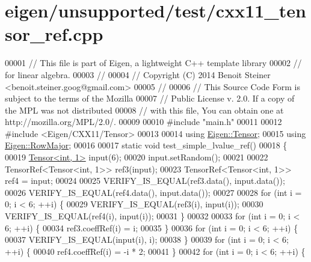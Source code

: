 \hypertarget{eigen_2unsupported_2test_2cxx11__tensor__ref_8cpp_source}{}\section{eigen/unsupported/test/cxx11\+\_\+tensor\+\_\+ref.cpp}
\label{eigen_2unsupported_2test_2cxx11__tensor__ref_8cpp_source}

\begin{DoxyCode}
00001 \textcolor{comment}{// This file is part of Eigen, a lightweight C++ template library}
00002 \textcolor{comment}{// for linear algebra.}
00003 \textcolor{comment}{//}
00004 \textcolor{comment}{// Copyright (C) 2014 Benoit Steiner <benoit.steiner.goog@gmail.com>}
00005 \textcolor{comment}{//}
00006 \textcolor{comment}{// This Source Code Form is subject to the terms of the Mozilla}
00007 \textcolor{comment}{// Public License v. 2.0. If a copy of the MPL was not distributed}
00008 \textcolor{comment}{// with this file, You can obtain one at http://mozilla.org/MPL/2.0/.}
00009 
00010 \textcolor{preprocessor}{#include "main.h"}
00011 
00012 \textcolor{preprocessor}{#include <Eigen/CXX11/Tensor>}
00013 
00014 \textcolor{keyword}{using} \hyperlink{class_eigen_1_1_tensor}{Eigen::Tensor};
00015 \textcolor{keyword}{using} \hyperlink{group__enums_ggaacded1a18ae58b0f554751f6cdf9eb13acfcde9cd8677c5f7caf6bd603666aae3}{Eigen::RowMajor};
00016 
00017 \textcolor{keyword}{static} \textcolor{keywordtype}{void} test\_simple\_lvalue\_ref()
00018 \{
00019   \hyperlink{class_eigen_1_1_tensor}{Tensor<int, 1>} input(6);
00020   input.setRandom();
00021 
00022   TensorRef<Tensor<int, 1>> ref3(input);
00023   TensorRef<Tensor<int, 1>> ref4 = input;
00024 
00025   VERIFY\_IS\_EQUAL(ref3.data(), input.data());
00026   VERIFY\_IS\_EQUAL(ref4.data(), input.data());
00027 
00028   \textcolor{keywordflow}{for} (\textcolor{keywordtype}{int} i = 0; i < 6; ++i) \{
00029     VERIFY\_IS\_EQUAL(ref3(i), input(i));
00030     VERIFY\_IS\_EQUAL(ref4(i), input(i));
00031   \}
00032 
00033   \textcolor{keywordflow}{for} (\textcolor{keywordtype}{int} i = 0; i < 6; ++i) \{
00034     ref3.coeffRef(i) = i;
00035   \}
00036   \textcolor{keywordflow}{for} (\textcolor{keywordtype}{int} i = 0; i < 6; ++i) \{
00037     VERIFY\_IS\_EQUAL(input(i), i);
00038   \}
00039   \textcolor{keywordflow}{for} (\textcolor{keywordtype}{int} i = 0; i < 6; ++i) \{
00040     ref4.coeffRef(i) = -i * 2;
00041   \}
00042   \textcolor{keywordflow}{for} (\textcolor{keywordtype}{int} i = 0; i < 6; ++i) \{

\end{DoxyCode}
